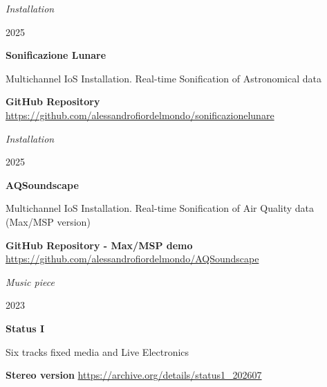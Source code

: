 \documentclass[7pt,a4paper]{article}
\begin{document}
\begin{mdframed}[
    backgroundcolor=entrygray,
    linecolor=entrygray,
    linewidth=0pt,
    innerleftmargin=6pt,
    innerrightmargin=6pt,
    innertopmargin=6pt,
    innerbottommargin=6pt,
    skipabove=0pt,
    skipbelow=0pt
]

\scriptsize \textit{Installation}
\par \small 2025
\par \normalsize \textbf{Sonificazione Lunare}
\par \small Multichannel IoS Installation. Real-time Sonification of Astronomical data


\par \scriptsize \textbf{GitHub Repository} \href{https://github.com/alessandrofiordelmondo/sonificazionelunare}{https://github.com/alessandrofiordelmondo/sonificazionelunare}


\vspace{0.5cm}
\end{mdframed}


\begin{mdframed}[
    backgroundcolor=white,
    linecolor=white,
    linewidth=0pt,
    innerleftmargin=6pt,
    innerrightmargin=6pt,
    innertopmargin=6pt,
    innerbottommargin=6pt,
    skipabove=0pt,
    skipbelow=0pt
]

\scriptsize \textit{Installation}
\par \small 2025
\par \normalsize \textbf{AQSoundscape}
\par \small Multichannel IoS Installation. Real-time Sonification of Air Quality data (Max/MSP version)


\par \scriptsize \textbf{GitHub Repository - Max/MSP demo} \href{https://github.com/alessandrofiordelmondo/AQSoundscape}{https://github.com/alessandrofiordelmondo/AQSoundscape}


\vspace{0.5cm}
\end{mdframed}


\begin{mdframed}[
    backgroundcolor=entrygray,
    linecolor=entrygray,
    linewidth=0pt,
    innerleftmargin=6pt,
    innerrightmargin=6pt,
    innertopmargin=6pt,
    innerbottommargin=6pt,
    skipabove=0pt,
    skipbelow=0pt
]

\scriptsize \textit{Music piece}
\par \small 2023
\par \normalsize \textbf{Status I}
\par \small Six tracks fixed media and Live Electronics


\par \scriptsize \textbf{Stereo version} \href{https://archive.org/details/status1\_202607}{https://archive.org/details/status1\_202607}


\vspace{0.5cm}
\end{mdframed}
\end{document}
